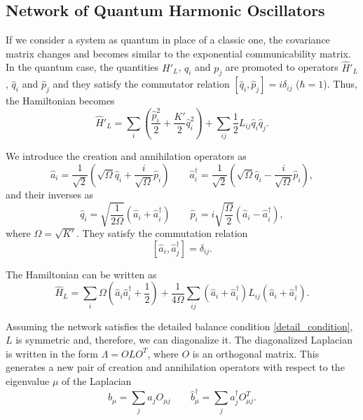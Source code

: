 \subsection{Network of Quantum Harmonic Oscillators}

If we consider a system as quantum in place of a classic one, the covariance matrix changes and becomes similar to the exponential communicability matrix.
In the quantum case, the quantities $H'_L$, $q_i$ and $p_j$ are promoted to operators $\hat H'_L$, $\hat q_i$ and $\hat p_j$ and they satisfy the commutator relation $\left[\hat q_i, \hat p_j\right] = i \delta_{ij}$ ($\hbar = 1$). Thus, the Hamiltonian becomes
\begin{equation}\label{H_L_QM}
    \hat H'_L = \sum_i\left(\frac{\hat p_i^2}{2}+\frac{K'}{2}\hat q_i^2\right) + \sum_{ij}\frac{1}{2} L_{ij}\hat q_i\hat q_j.
\end{equation}

We introduce the creation and annihilation operators as
\begin{equation}
     \hat a_i = \frac{1}{\sqrt{2}}\left(\sqrt{\Omega} \hat q_i + \frac{i}{\sqrt{\Omega}}\hat p_i\right) \qquad 
     \hat a_i^\dagger = \frac{1}{\sqrt{2}}\left(\sqrt{\Omega} \hat q_i - \frac{i}{\sqrt{\Omega}}\hat p_i\right), 
\end{equation}
and their inverses as
\begin{equation}
    \hat q_i = \sqrt{\frac{1}{2\Omega}}\left(\hat a_i + \hat a_i^\dagger\right) \qquad
    \hat p_i = i\sqrt{\frac{\Omega}{2}}\left(\hat a_i - \hat a_i^\dagger\right),
\end{equation}
where $\Omega = \sqrt{K'}$.
They satisfy the commutation relation 
\begin{equation}
    \left[\hat a_i, \hat a^\dagger_j\right] = \delta_{ij}.
\end{equation}

The Hamiltonian can be written as 
\begin{equation}
    \hat H_L = \sum_i \Omega \left(\hat a_i\hat a^\dagger_i + \frac{1}{2}\right) + \frac{1}{4\Omega}\sum_{ij}\left(\hat a_i +\hat a_i^\dagger\right)L_{ij}\left(\hat a_i +\hat a_i^\dagger\right).
\end{equation}

Assuming the network satisfies the detailed balance condition \eqref{detail_condition}, $L$ is symmetric and, therefore, we can diagonalize it. The diagonalized Laplacian is written in the form $\Lambda = OLO^T$, where $O$ is an orthogonal matrix.
This generates a new pair of creation and annihilation operators with respect to the eigenvalue $\mu$ of the Laplacian
\begin{equation}
    b_\mu = \sum_j a_jO_{\mu j}  \qquad \hat b_\mu^\dagger = \sum_j a_j^\dagger O^T_{\mu j} .
\end{equation}


